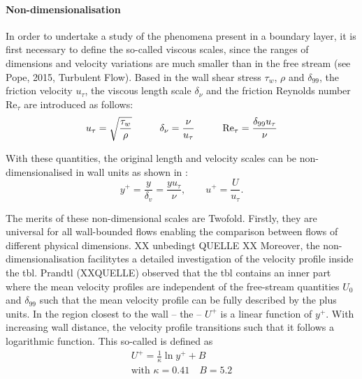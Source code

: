 \paragraph{Non-dimensionalisation}
In order to undertake a study of the phenomena present in a boundary layer, it is first necessary to define the so-called viscous scales, since the ranges of dimensions and velocity variations are much smaller than in the free stream (see Pope, 2015, Turbulent Flow).
%
Based in the wall shear stress $\tau_w$, $\rho$ and $\delta_{99}$, the friction velocity $u_{\tau}$, the viscous length scale $\delta_{\nu}$ and the friction Reynolds number $\mathrm{Re}_{\tau}$ are introduced as follows:
\begin{gather}
    u_{\tau} = \sqrt{\frac{\tau_w}{\rho}} \hspace{1.0cm}
    \delta_{\nu} = \frac{\nu}{u_{\tau}} \hspace{1.0cm}
    \mathrm{Re}_{\tau} = \frac{\delta_{99} u_\tau}{\nu}
\end{gather}

With these quantities, the original length and velocity scales can be non-dimensionalised in wall units as shown in \citep{moin_fundamentals_2024}:
\begin{equation}
    y^+ = \frac{y}{\delta_v} = \frac{y u_\tau}{\nu}, \qquad
    u^+ = \frac{U}{u_\tau}.
\end{equation}

The merits of these non-dimensional scales are Twofold.  Firstly, they are universal for all wall-bounded flows enabling the comparison between flows of different physical dimensions. XX unbedingt QUELLE XX
Moreover, the non-dimensionalisation facilitytes a detailed investigation of the velocity profile inside the \acrshort{tbl}.
Prandtl (XXQUELLE) observed that the \acrshort{tbl} contains an inner part where the mean velocity profiles are independent of the free-stream quantities $U_0$ and $\delta_{99}$ such that the mean velocity profile can be fully described by the plus units.
In the region closest to the wall – the  – $U^+$ is a linear function of $y^+$. 
With increasing wall distance, the velocity profile transitions such that it follows a logarithmic function.
This so-called  is defined as 
\begin{gather}
    U^+ = \frac{1}{\kappa}\ln y^+ + B \\
    \text{with } \kappa = 0.41 \quad B = 5.2
\end{gather}

